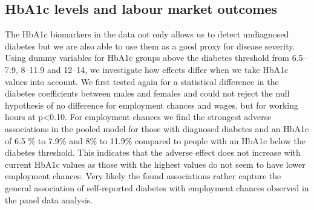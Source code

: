\subsection{HbA1c levels and labour market outcomes}

The \ac{HbA1c} biomarkers in the data not only allows us to detect
undiagnosed diabetes but we are also able to use them as a good proxy
for disease severity. Using dummy variables for \ac{HbA1c} groups
above the diabetes threshold from 6.5--7.9, 8--11.9 and 12--14, we
investigate how effects differ when we take \ac{HbA1c} values into
account. We first tested again for a statistical difference in the
diabetes coefficients between males and females and could not reject
the null hypothesis of no difference for employment chances and wages,
but for working hours at p<0.10. For employment chances we find the
strongest adverse associations in the pooled model for those with
diagnosed diabetes and an \ac{HbA1c} of 6.5 \% to 7.9\% and 8\% to
11.9\% compared to people with an \ac{HbA1c} below the diabetes threshold.
This indicates that the adverse effect does not increase with current
\ac{HbA1c} values as those with the highest values do not seem to
have lower employment chances. Very likely the found associations
rather capture the general association of self-reported diabetes with
employment chances observed in the panel data analysis.



